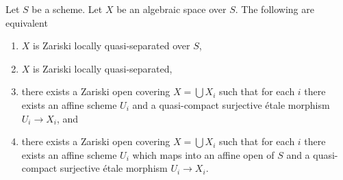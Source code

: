 \begin{lemma}
\label{lemma-quasi-separated-quasi-compact-pieces}
Let $S$ be a scheme.
Let $X$ be an algebraic space over $S$.
The following are equivalent
\begin{enumerate}
\item $X$ is Zariski locally quasi-separated over $S$,
\item $X$ is Zariski locally quasi-separated,
\item there exists a Zariski open covering $X = \bigcup X_i$
such that for each $i$ there exists an affine scheme
$U_i$ and a quasi-compact surjective \'etale
morphism $U_i \to X_i$, and
\item there exists a Zariski open covering $X = \bigcup X_i$
such that for each $i$ there exists an affine scheme
$U_i$ which maps into an affine open of $S$ and a quasi-compact
surjective \'etale morphism $U_i \to X_i$.
\end{enumerate}
\end{lemma}

